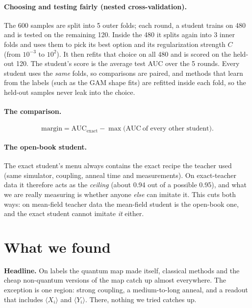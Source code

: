 \documentclass[11pt]{article}
\begin{document}
\paragraph{Choosing and testing fairly (nested cross-validation).} The 600 samples are split into 5 outer
folds; each round, a student trains on 480 and is tested on the remaining 120. Inside the 480 it splits again
into 3 inner folds and uses them to pick its best option and its regularization strength $C$ (from $10^{-3}$ to
$10^{2}$). It then refits that choice on all 480 and is scored on the held-out 120. The student's score is the
average test AUC over the 5 rounds. Every student uses the \emph{same} folds, so comparisons are paired, and
methods that learn from the labels (such as the GAM shape fits) are refitted inside each fold, so the
held-out samples never leak into the choice.

\paragraph{The comparison.}
\begin{equation}
\text{margin}=\mathrm{AUC}_{\text{exact}}-\max\big(\mathrm{AUC}\ \text{of every other student}\big).
\end{equation}

\paragraph{The open-book student.} The exact student's menu always contains the exact recipe the teacher
used (same simulator, coupling, anneal time and measurements). On exact-teacher data it therefore acts as the
\emph{ceiling} (about 0.94 out of a possible 0.95), and what we are really measuring is whether anyone
\emph{else} can imitate it. This cuts both ways: on mean-field teacher data the mean-field student is the
open-book one, and the exact student cannot imitate \emph{it} either.


\section{What we found}

\textbf{Headline.} On labels the quantum map made itself, classical methods and the cheap non-quantum
versions of the map catch up almost everywhere. The exception is one region: strong coupling, a medium-to-long
anneal, and a readout that includes $\langle X_i\rangle$ and $\langle Y_i\rangle$. There, nothing we tried
catches up.
\end{document}
